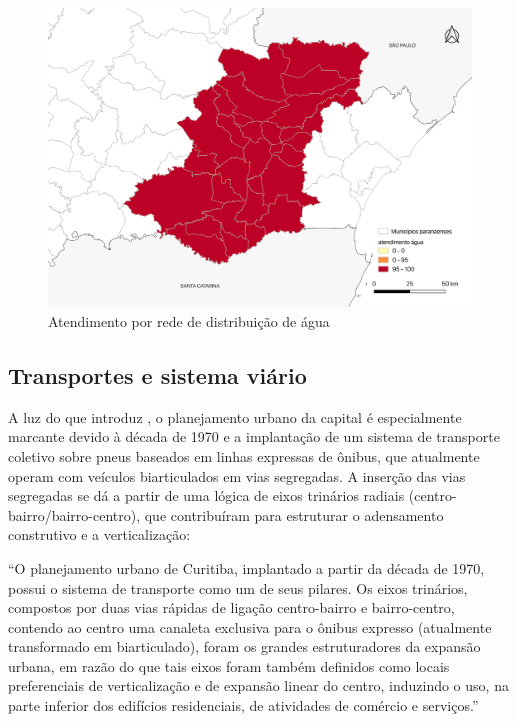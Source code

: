 	\begin{landscape}
		\begin{figure}
			\centering
			\caption{Atendimento por rede de distribuição de água}
			\label{fig:saneamentorede}
			\includegraphics[width=0.80\linewidth]{img/snis_C}
		\end{figure}
	\end{landscape}

	\subsection{Transportes e sistema viário} \label{sec:transportes}
	
	A luz do que introduz , o planejamento urbano da capital é especialmente marcante devido à década de 1970 e a implantação de um sistema de transporte coletivo sobre pneus baseados em linhas expressas de ônibus, que atualmente operam com veículos biarticulados em vias segregadas. A inserção das vias segregadas se dá a partir de uma lógica de eixos trinários radiais (centro-bairro/bairro-centro), que contribuíram para estruturar o adensamento construtivo e a verticalização:
	
	\begin{citacao}
		``O planejamento urbano de Curitiba, implantado a partir da década de 1970, possui o sistema de transporte como um de seus pilares. Os eixos trinários, compostos por duas vias rápidas de ligação centro-bairro e bairro-centro, contendo ao centro uma canaleta exclusiva para o ônibus expresso (atualmente transformado em biarticulado), foram os grandes estruturadores da expansão urbana, em razão do que tais eixos foram também definidos como locais preferenciais de verticalização e de expansão linear do centro, induzindo o uso, na parte inferior dos edifícios residenciais, de atividades de comércio e serviços.''
	\end{citacao}

